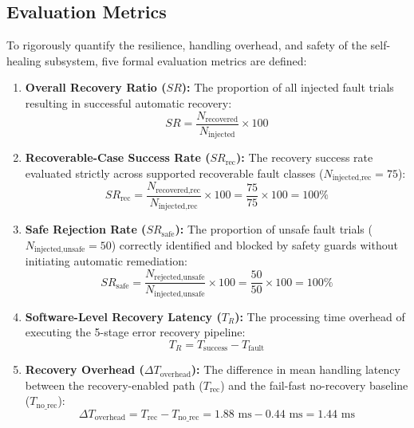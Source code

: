 \documentclass[conference]{IEEEtran}
\begin{document}
\subsection{Evaluation Metrics}
To rigorously quantify the resilience, handling overhead, and safety of the self-healing subsystem, five formal evaluation metrics are defined:

\begin{enumerate}
    \item \textbf{Overall Recovery Ratio ($SR$):} The proportion of all injected fault trials resulting in successful automatic recovery:
    \begin{equation}
    SR = \frac{N_{\text{recovered}}}{N_{\text{injected}}} \times 100
    \end{equation}

    \item \textbf{Recoverable-Case Success Rate ($SR_{\text{rec}}$):} The recovery success rate evaluated strictly across supported recoverable fault classes ($N_{\text{injected,rec}} = 75$):
    \begin{equation}
    SR_{\text{rec}} = \frac{N_{\text{recovered,rec}}}{N_{\text{injected,rec}}} \times 100 = \frac{75}{75} \times 100 = 100\%
    \end{equation}

    \item \textbf{Safe Rejection Rate ($SR_{\text{safe}}$):} The proportion of unsafe fault trials ($N_{\text{injected,unsafe}} = 50$) correctly identified and blocked by safety guards without initiating automatic remediation:
    \begin{equation}
    SR_{\text{safe}} = \frac{N_{\text{rejected,unsafe}}}{N_{\text{injected,unsafe}}} \times 100 = \frac{50}{50} \times 100 = 100\%
    \end{equation}

    \item \textbf{Software-Level Recovery Latency ($T_R$):} The processing time overhead of executing the 5-stage error recovery pipeline:
    \begin{equation}
    T_R = T_{\text{success}} - T_{\text{fault}}
    \end{equation}

    \item \textbf{Recovery Overhead ($\Delta T_{\text{overhead}}$):} The difference in mean handling latency between the recovery-enabled path ($T_{\text{rec}}$) and the fail-fast no-recovery baseline ($T_{\text{no\_rec}}$):
    \begin{equation}
    \Delta T_{\text{overhead}} = T_{\text{rec}} - T_{\text{no\_rec}} = 1.88\text{ ms} - 0.44\text{ ms} = 1.44\text{ ms}
    \end{equation}
\end{enumerate}
\end{document}
